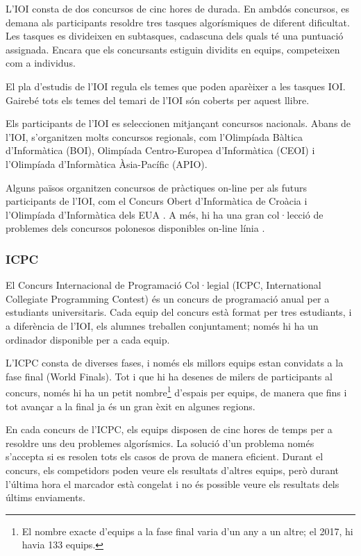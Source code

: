 L'IOI consta de dos concursos de cinc hores de durada.
En ambdós concursos, es demana als participants
resoldre tres tasques algorísmiques de diferent dificultat.
Les tasques es divideixen en subtasques,
cadascuna dels quals té una puntuació assignada.
Encara que els concursants estiguin dividits en equips,
competeixen com a individus.

El pla d'estudis de l'IOI \cite{iois} regula els temes
que poden aparèixer a les tasques IOI.
Gairebé tots els temes del temari de l'IOI
són coberts per aquest llibre.

Els participants de l'IOI es seleccionen mitjançant
concursos nacionals.
Abans de l'IOI, s'organitzen molts concursos regionals,
com l'Olimpíada Bàltica d'Informàtica (BOI),
Olimpíada Centro-Europea d'Informàtica (CEOI)
i l'Olimpíada d'Informàtica Àsia-Pacífic (APIO).

Alguns països organitzen concursos de pràctiques on-line
per als futurs participants de l'IOI,
com el Concurs Obert d'Informàtica de Croàcia \cite{coci}
i l'Olimpíada d'Informàtica dels EUA \cite{usaco}.
A més, hi ha una gran col·lecció de problemes dels concursos polonesos
disponibles on-line línia \cite{main}.

\subsubsection{ICPC}

El Concurs Internacional de Programació Col·legial (ICPC,
International Collegiate Programming Contest)
és un concurs de programació anual per a estudiants universitaris.
Cada equip del concurs està format per tres estudiants,
i a diferència de l'IOI, els alumnes treballen conjuntament;
només hi ha un ordinador disponible per a cada equip.

L'ICPC consta de diverses fases, i només els millors
equips estan convidats a la fase final (World Finals).
Tot i que hi ha desenes de milers de participants
al concurs, només hi ha un petit nombre\footnote{El nombre exacte d'equips
a la fase final varia d'un any a un altre; el 2017, hi havia
133 equips.} d'espais per equips, de manera que fins i tot avançar a
la final ja és un gran èxit en algunes regions.

En cada concurs de l'ICPC, els equips disposen de cinc hores de temps
per a resoldre uns deu problemes algorísmics.
La solució d'un problema només s'accepta si es resolen
tots els casos de prova de manera eficient.
Durant el concurs, els competidors poden veure els resultats d'altres equips,
però durant l'última hora el marcador està congelat i no és
possible veure els resultats dels últims enviaments.


